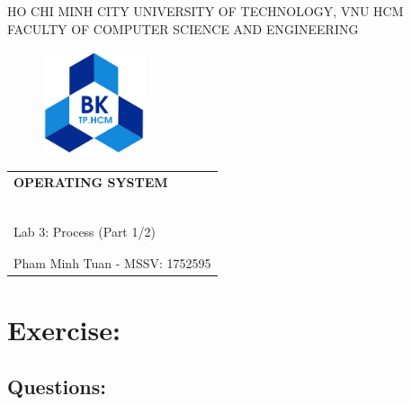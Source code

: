 \documentclass[a4paper]{article}
\begin{document}
    \begin{titlepage}
        \begin{center}
            HO CHI MINH CITY UNIVERSITY OF TECHNOLOGY, VNU HCM \\
            FACULTY OF COMPUTER SCIENCE AND ENGINEERING
        \end{center}

        \vspace{1cm}

        \begin{figure}[h!]
            \begin{center}
                \includegraphics[width=3cm]{hcmut.png}
            \end{center}
        \end{figure}

        \vspace{1cm}

        \begin{center}
            \begin{tabular}{c}
                \multicolumn{1}{l}{\textbf{\LARGE OPERATING SYSTEM}} \\
                ~~\\
                \hline
                \\
                \multicolumn{1}{l}{\LARGE Lab 3: Process (Part 1/2)} \\
                \\
                \hline
                \\
                \hspace{5cm} Pham Minh Tuan - MSSV: 1752595
            \end{tabular}
        \end{center}
    \end{titlepage}

\newpage

\section{\large Exercise: }
\subsection{\large Questions: }
\end{document}
